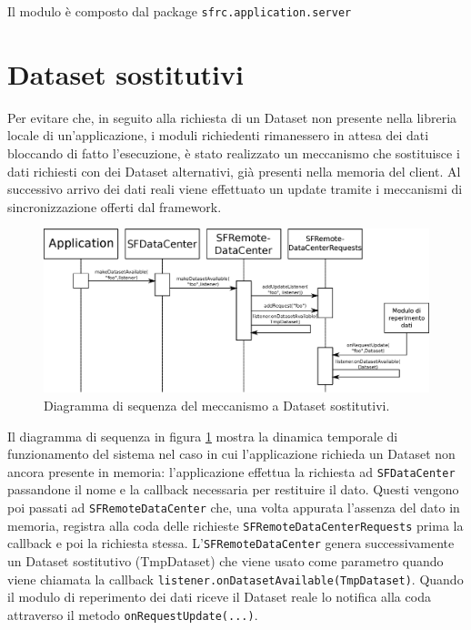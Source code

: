 Il modulo \`e composto dal package \texttt{sfrc.application.server}

\section{Dataset sostitutivi}
\label{sec:dataset_sost}
Per evitare che, in seguito alla richiesta di un Dataset non presente nella libreria locale di un'applicazione, i moduli richiedenti rimanessero in attesa dei dati bloccando di fatto l'esecuzione, \`e stato realizzato un meccanismo che sostituisce i dati richiesti con dei Dataset alternativi, gi\`a presenti nella memoria del client. Al successivo arrivo dei dati reali viene effettuato un update tramite i meccanismi di sincronizzazione offerti dal framework.

\begin{figure}
\begin{center}
\includegraphics[width=\textwidth]{Immagini/sequenzaDatiSost}
\caption{Diagramma di sequenza del meccanismo a Dataset sostitutivi.\label{f:seqsost}} 
\end{center} 
\end{figure}

Il diagramma di sequenza in figura \ref{f:seqsost} mostra la dinamica temporale di funzionamento del sistema nel caso in cui l'applicazione richieda un Dataset non ancora presente in memoria: l'applicazione effettua la richiesta ad \texttt{SFDataCenter} passandone il nome e la callback necessaria per restituire il dato.
Questi vengono poi passati ad \texttt{SFRemoteDataCenter} che, una volta appurata l'assenza del dato in memoria, registra alla coda delle richieste \texttt{SFRemoteDataCenterRequests} prima la callback e poi la richiesta stessa. L'\texttt{SFRemoteDataCenter} genera successivamente un Dataset sostitutivo (TmpDataset) che viene usato come parametro quando viene chiamata la callback \texttt{listener.onDatasetAvailable(TmpDataset)}.
Quando il modulo di reperimento dei dati riceve il Dataset reale lo notifica alla coda attraverso il metodo \texttt{onRequestUpdate(...)}.

